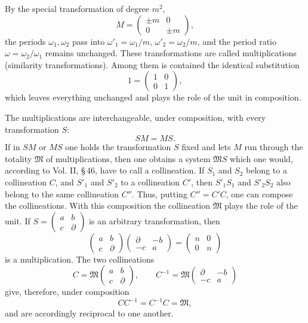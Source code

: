 \documentclass[11pt]{article}
\begin{document}
By the special transformation of degree $m^2$,
\[
M=\begin{pmatrix}\pm m&0\\0&\pm m\end{pmatrix},
\]
the periods $\omega_1,\omega_2$ pass into $\omega'_1=\omega_1/m$, $\omega'_2=\omega_2/m$, and the period ratio $\omega=\omega_2/\omega_1$ remains unchanged. These transformations are called multiplications (similarity transformations). Among them is contained the identical substitution
\[
1=\begin{pmatrix}1&0\\0&1\end{pmatrix},
\]
which leaves everything unchanged and plays the role of the unit in composition.

The multiplications are interchangeable, under composition, with every transformation $S$:
\begin{equation}
SM=MS. \tag{7}
\end{equation}
If in $SM$ or $MS$ one holds the transformation $S$ fixed and lets $M$ run through the totality $\mathfrak M$ of multiplications, then one obtains a system $\mathfrak M S$ which one would, according to Vol. II, \S\,46, have to call a collineation. If $S_1$ and $S_2$ belong to a collineation $C$, and $S'_1$ and $S'_2$ to a collineation $C'$, then $S'_1S_1$ and $S'_2S_2$ also belong to the same collineation $C''$. Thus, putting $C''=C'C$, one can compose the collineations. With this composition the collineation $\mathfrak M$ plays the role of the unit. If $S=\begin{pmatrix}a&b\\c&\partial\end{pmatrix}$ is an arbitrary transformation, then
\[
\begin{pmatrix}a&b\\c&\partial\end{pmatrix}
\begin{pmatrix}\partial&-b\\-c&a\end{pmatrix}
=\begin{pmatrix}n&0\\0&n\end{pmatrix}
\]
is a multiplication. The two collineations
\[
C=\mathfrak M\begin{pmatrix}a&b\\c&\partial\end{pmatrix},
\qquad
C^{-1}=\mathfrak M\begin{pmatrix}\partial&-b\\-c&a\end{pmatrix}
\]
give, therefore, under composition
\[
CC^{-1}=C^{-1}C=\mathfrak M,
\]
and are accordingly reciprocal to one another.
\end{document}
